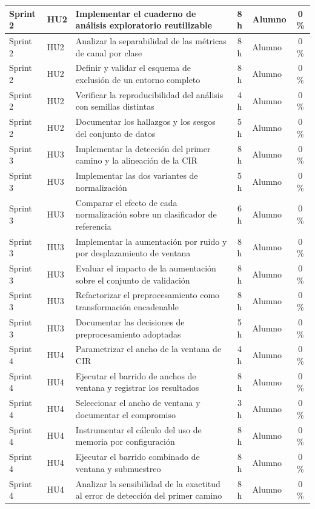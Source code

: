 \documentclass[
11pt, %
]{charter}
\begin{document}
\begin{longtable}{@{}|l|l|p{5.4cm}|c|l|c|@{}}
Sprint 2 & HU2 & Implementar el cuaderno de análisis exploratorio reutilizable & 8 h & Alumno & 0 \% \\ \hline
Sprint 2 & HU2 & Analizar la separabilidad de las métricas de canal por clase & 8 h & Alumno & 0 \% \\ \hline
Sprint 2 & HU2 & Definir y validar el esquema de exclusión de un entorno completo & 8 h & Alumno & 0 \% \\ \hline
Sprint 2 & HU2 & Verificar la reproducibilidad del análisis con semillas distintas & 4 h & Alumno & 0 \% \\ \hline
Sprint 2 & HU2 & Documentar los hallazgos y los sesgos del conjunto de datos & 5 h & Alumno & 0 \% \\ \hline
Sprint 3 & HU3 & Implementar la detección del primer camino y la alineación de la CIR & 8 h & Alumno & 0 \% \\ \hline
Sprint 3 & HU3 & Implementar las dos variantes de normalización & 5 h & Alumno & 0 \% \\ \hline
Sprint 3 & HU3 & Comparar el efecto de cada normalización sobre un clasificador de referencia & 6 h & Alumno & 0 \% \\ \hline
Sprint 3 & HU3 & Implementar la aumentación por ruido y por desplazamiento de ventana & 8 h & Alumno & 0 \% \\ \hline
Sprint 3 & HU3 & Evaluar el impacto de la aumentación sobre el conjunto de validación & 8 h & Alumno & 0 \% \\ \hline
Sprint 3 & HU3 & Refactorizar el preprocesamiento como transformación encadenable & 8 h & Alumno & 0 \% \\ \hline
Sprint 3 & HU3 & Documentar las decisiones de preprocesamiento adoptadas & 5 h & Alumno & 0 \% \\ \hline
Sprint 4 & HU4 & Parametrizar el ancho de la ventana de CIR & 4 h & Alumno & 0 \% \\ \hline
Sprint 4 & HU4 & Ejecutar el barrido de anchos de ventana y registrar los resultados & 8 h & Alumno & 0 \% \\ \hline
Sprint 4 & HU4 & Seleccionar el ancho de ventana y documentar el compromiso & 3 h & Alumno & 0 \% \\ \hline
Sprint 4 & HU4 & Instrumentar el cálculo del uso de memoria por configuración & 8 h & Alumno & 0 \% \\ \hline
Sprint 4 & HU4 & Ejecutar el barrido combinado de ventana y submuestreo & 8 h & Alumno & 0 \% \\ \hline
Sprint 4 & HU4 & Analizar la sensibilidad de la exactitud al error de detección del primer camino & 8 h & Alumno & 0 \% \\ \hline

\end{longtable}
\end{document}
